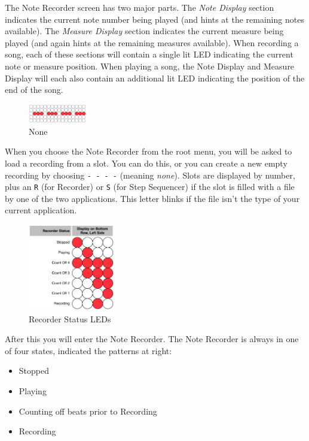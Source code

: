 \documentclass{article}
\begin{document}
The Note Recorder screen has two major parts.  The {\it Note Display} section indicates the current note number being played (and hints at the remaining notes available).  The {\it Measure Display} section indicates the current measure being played (and again hints at the remaining measures available).  When recording a song, each of these sections will contain a single lit LED indicating the current note or measure position.  When playing a song, the Note Display and Measure Display will each also contain an additional lit LED indicating the position of the end of the song.

\begin{figure}
\includegraphics[width=1in]{none.pdf}
\vspace{-2em}\caption{\small None}\vspace{-1em}
\label{none}
\end{figure}

When you choose the Note Recorder from the root menu, you will be asked to load a recording from a slot.  You can do this, or you can create a new empty recording by choosing \texttt{-~-~-~-} (meaning {\it none}).  Slots are displayed by number, plus an \texttt{R} (for Recorder) or \texttt{S} (for Step Sequencer) if the slot is filled with a file by one of the two applications.  This letter blinks if the file isn't the type of your current application.

\begin{figure}
\includegraphics[width=1.5in]{recorderstatus.pdf}
\vspace{-2em}\caption{\small Recorder Status LEDs}\vspace{-4em}
\label{recorderstatus}
\end{figure}

After this you will enter the Note Recorder.  The Note Recorder is always in one of four states, indicated the patterns at right:

\begin{itemize}
\item Stopped
\item Playing
\item Counting off beats prior to Recording
\item Recording
\end{itemize}
\end{document}
